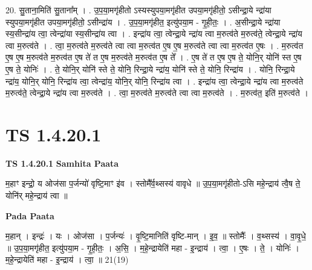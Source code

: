 \documentclass[17pt]{extarticle}
\begin{document}
20. सु॒ताना॒मिति॑ सु॒ताना᳚म् । . उ॒प॒या॒मगृ॑हीतो ऽस्यस्युपया॒मगृ॑हीत उपया॒मगृ॑हीतो॒ ऽसीन्द्रा॒ये न्द्रा॑या स्युपया॒मगृ॑हीत उपया॒मगृ॑हीतो॒ ऽसीन्द्रा॑य । . उ॒प॒या॒मगृ॑हीत॒ इत्यु॑पया॒म - गृ॒ही॒तः॒ । . अ॒सीन्द्रा॒ये न्द्रा॑या स्य॒सीन्द्रा॑य त्वा॒ त्वेन्द्रा॑या स्य॒सीन्द्रा॑य त्वा । . इन्द्रा॑य त्वा॒ त्वेन्द्रा॒ये न्द्रा॑य त्वा म॒रुत्व॑ते म॒रुत्व॑ते॒ त्वेन्द्रा॒ये न्द्रा॑य त्वा म॒रुत्व॑ते । . त्वा॒ म॒रुत्व॑ते म॒रुत्व॑ते त्वा त्वा म॒रुत्व॑त ए॒ष ए॒ष म॒रुत्व॑ते त्वा त्वा म॒रुत्व॑त ए॒षः । . म॒रुत्व॑त ए॒ष ए॒ष म॒रुत्व॑ते म॒रुत्व॑त ए॒ष ते॑ त ए॒ष म॒रुत्व॑ते म॒रुत्व॑त ए॒ष ते᳚ । . ए॒ष ते॑ त ए॒ष ए॒ष ते॒ योनि॒र् योनि॑ स्त ए॒ष ए॒ष ते॒ योनिः॑ । . ते॒ योनि॒र् योनि॑ स्ते ते॒ योनि॒ रिन्द्रा॒ये न्द्रा॑य॒ योनि॑ स्ते ते॒ योनि॒ रिन्द्रा॑य । . योनि॒ रिन्द्रा॒ये न्द्रा॑य॒ योनि॒र् योनि॒ रिन्द्रा॑य त्वा॒ त्वेन्द्रा॑य॒ योनि॒र् योनि॒ रिन्द्रा॑य त्वा । . इन्द्रा॑य त्वा॒ त्वेन्द्रा॒ये न्द्रा॑य त्वा म॒रुत्व॑ते म॒रुत्व॑ते॒ त्वेन्द्रा॒ये न्द्रा॑य त्वा म॒रुत्व॑ते । . त्वा॒ म॒रुत्व॑ते म॒रुत्व॑ते त्वा त्वा म॒रुत्व॑ते । . म॒रुत्व॑त॒ इति॑ म॒रुत्व॑ते । \newline
\pagebreak
{}

\section{ TS 1.4.20.1 }

\textbf{TS 1.4.20.1 } \newline
\textbf{Samhita Paata} \newline

म॒हाꣳ इन्द्रो॒ य ओज॑सा प॒र्जन्यो॑ वृष्टि॒माꣳ इ॑व । स्तोमै᳚र्व॒थ्सस्य॑ वावृधे ॥ उ॒प॒या॒मगृ॑हीतो-ऽसि महे॒न्द्राय॑ त्वै॒ष ते॒ योनि॑र् महे॒न्द्राय॑ त्वा ॥ \newline

\textbf{Pada Paata} \newline

म॒हान् । इन्द्रः॑ । यः । ओज॑सा । प॒र्जन्यः॑ । वृ॒ष्टि॒मानिति॑ वृष्टि-मान् । इ॒व॒ ॥ स्तोमैः᳚ । व॒थ्सस्य॑ । वा॒वृ॒धे॒ ॥ उ॒प॒या॒मगृ॑हीत॒ इत्यु॑पया॒म - गृ॒ही॒तः॒ । अ॒सि॒ । म॒हे॒न्द्रायेति॑ महा - इ॒न्द्राय॑ । त्वा॒ । ए॒षः । ते॒ । योनिः॑ । म॒हे॒न्द्रायेति॑ महा - इ॒न्द्राय॑ । त्वा॒ ॥ 21(19)  \newline
\end{document}
